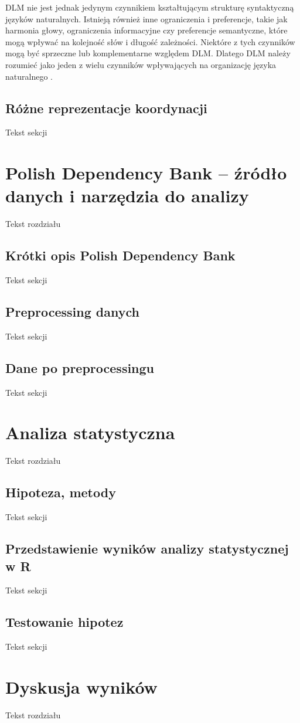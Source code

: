 \documentclass[licencjacka]{pracamgr_Kogni}
\begin{document}
DLM nie jest jednak jedynym czynnikiem kształtującym strukturę syntaktyczną języków naturalnych. Istnieją również inne ograniczenia i preferencje, takie jak harmonia głowy, ograniczenia informacyjne czy preferencje semantyczne, które mogą wpływać na kolejność słów i długość zależności. Niektóre z tych czynników mogą być sprzeczne lub komplementarne względem DLM. Dlatego DLM należy rozumieć jako jeden z wielu czynników wpływających na organizację języka naturalnego \citep{Temperley2018}.

\section{Różne reprezentacje koordynacji}
Tekst sekcji

\chapter{Polish Dependency Bank -- źródło danych i narzędzia do analizy}
Tekst rozdziału
\section{Krótki opis Polish Dependency Bank}
Tekst sekcji
\section{Preprocessing danych}
Tekst sekcji
\section{Dane po preprocessingu}
Tekst sekcji

\chapter{Analiza statystyczna}
Tekst rozdziału
\section{Hipoteza, metody}
Tekst sekcji
\section{Przedstawienie wyników analizy statystycznej w R}
Tekst sekcji
\section{Testowanie hipotez}
Tekst sekcji

\chapter{Dyskusja wyników}
Tekst rozdziału
\end{document}
